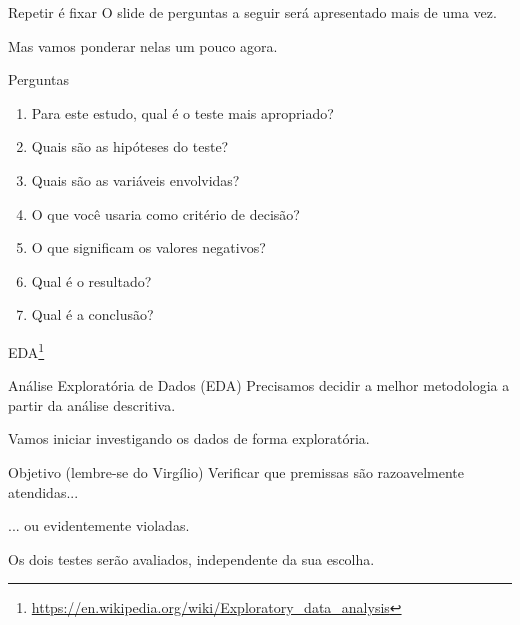 \documentclass{beamer}
\begin{document}
\begin{frame}
  \begin{block}{Repetir é fixar}
    {\small
    O slide de perguntas a seguir será apresentado mais de uma vez.}

    \begin{center}
      Mas vamos ponderar nelas um pouco agora.
    \end{center}
  \end{block}
\end{frame}

\begin{frame}[label=perguntas]{Perguntas}
  \begin{enumerate}
  \item Para este estudo, qual é o teste mais apropriado?
  \item Quais são as hipóteses do teste?
  \item Quais são as variáveis envolvidas?
  \item O que você usaria como critério de decisão?
  \item O que significam os valores negativos?
  \item Qual é o resultado?
  \item Qual é a conclusão?
  \end{enumerate}
\end{frame}

\begin{frame}{EDA\footnote{\scriptsize \url{https://en.wikipedia.org/wiki/Exploratory_data_analysis}}}
  \begin{block}{Análise Exploratória de Dados (EDA)}
    \footnotesize
    Precisamos decidir a melhor metodologia a partir da análise descritiva.

    \bigskip
    Vamos iniciar investigando os dados de forma exploratória.
  \end{block}
  \vfill
  \begin{block}{Objetivo (lembre-se do Virgílio)}
    Verificar que premissas são razoavelmente atendidas...

    \bigskip
    ... ou evidentemente violadas.
  \end{block}
\end{frame}

\begin{frame}
  \begin{center}
    {\LARGE

      Os dois testes serão avaliados, independente da sua escolha.

    }
  \end{center}
  \vfill
\end{frame}
\end{document}
